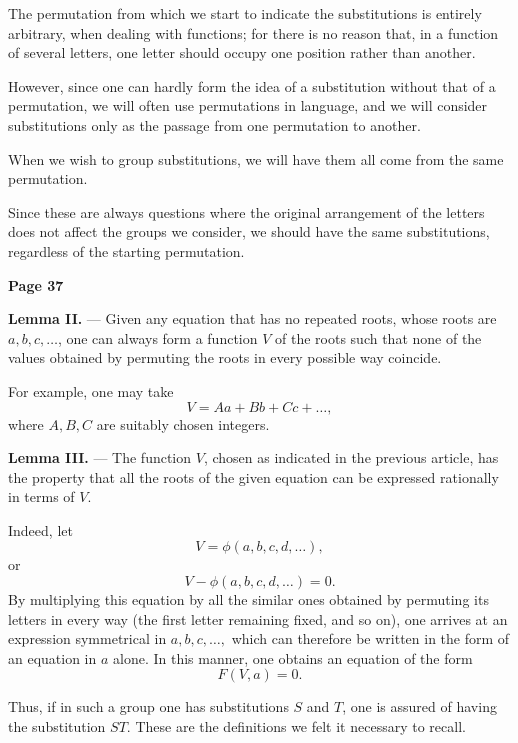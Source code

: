 \documentclass{article}
\begin{document}
The permutation from which we start to indicate the substitutions is entirely arbitrary, when dealing with functions; for there is no reason that, in a function of several letters, one letter should occupy one position rather than another.

\smallskip

However, since one can hardly form the idea of a substitution without that of a permutation, we will often use permutations in language, and we will consider substitutions only as the passage from one permutation to another.

\smallskip

When we wish to group substitutions, we will have them all come from the same permutation.

\smallskip

Since these are always questions where the original arrangement of the letters does not affect the groups we consider, we should have the same substitutions, regardless of the starting permutation.


\textbf{Page 37}

\medskip

\noindent
\textbf{Lemma II.} --- Given any equation that has no repeated roots, whose roots are \(a, b, c, \dots\), one can always form a function \(V\) of the roots such that none of the values obtained by permuting the roots in every possible way coincide.

\smallskip

\noindent
For example, one may take
\[
V = Aa + Bb + Cc + \dots,
\]
where \(A, B, C\) are suitably chosen integers.

\medskip

\noindent
\textbf{Lemma III.} --- The function \(V\), chosen as indicated in the previous article, has the property that all the roots of the given equation can be expressed rationally in terms of \(V\).

\smallskip

\noindent
Indeed, let
\[
V = \phi(a, b, c, d, \dots),
\]
or
\[
V - \phi(a, b, c, d, \dots) = 0.
\]
By multiplying this equation by all the similar ones obtained by permuting its letters in every way (the first letter remaining fixed, and so on), one arrives at an expression symmetrical in \(a, b, c, \dots,\) which can therefore be written in the form of an equation in \(a\) alone. In this manner, one obtains an equation of the form
\[
F(V, a) = 0.
\]

\smallskip

\noindent
Thus, if in such a group one has substitutions \(S\) and \(T\), one is assured of having the substitution \(ST\). These are the definitions we felt it necessary to recall.
\end{document}
